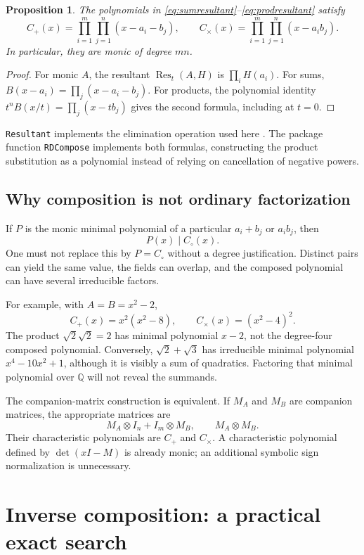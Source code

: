 \documentclass[11pt,letterpaper]{article}
\newtheorem{proposition}[theorem]{Proposition}
\theoremstyle{definition}
\newcommand{\Q}{\mathbb Q}
\newcommand{\Res}{\operatorname{Res}}
\newcommand{\code}[1]{\texttt{#1}}
\begin{document}
\begin{proposition}\label{prop:forward}
The polynomials in \eqref{eq:sumresultant}--\eqref{eq:prodresultant} satisfy
\[
 C_+(x)=\prod_{i=1}^{m}\prod_{j=1}^{n}(x-a_i-b_j),\qquad
 C_{\times}(x)=\prod_{i=1}^{m}\prod_{j=1}^{n}(x-a_ib_j).
\]
In particular, they are monic of degree $mn$.
\end{proposition}
\begin{proof}
For monic $A$, the resultant $\Res_t(A,H)$ is $\prod_i H(a_i)$. For sums,
$B(x-a_i)=\prod_j(x-a_i-b_j)$. For products, the polynomial identity
$t^nB(x/t)=\prod_j(x-tb_j)$ gives the second formula, including at $t=0$.
\end{proof}
\code{Resultant} implements the elimination operation used here \cite{resultant}. The package function \code{RDCompose} implements both formulas, constructing the product substitution as a polynomial instead of relying on cancellation of negative powers.

\subsection{Why composition is not ordinary factorization}
If $P$ is the monic minimal polynomial of a particular $a_i+b_j$ or $a_ib_j$, then
\begin{equation}\label{eq:divisibility}
 P(x)\mid C_{\circ}(x).
\end{equation}
One must not replace this by $P=C_{\circ}$ without a degree justification. Distinct pairs can yield the same value, the fields can overlap, and the composed polynomial can have several irreducible factors.

For example, with $A=B=x^2-2$,
\[
 C_+(x)=x^2(x^2-8),\qquad C_{\times}(x)=(x^2-4)^2.
\]
The product $\sqrt2\sqrt2=2$ has minimal polynomial $x-2$, not the degree-four composed polynomial. Conversely, $\sqrt2+\sqrt3$ has irreducible minimal polynomial $x^4-10x^2+1$, although it is visibly a sum of quadratics. Factoring that minimal polynomial over $\Q$ will not reveal the summands.

The companion-matrix construction is equivalent. If $M_A$ and $M_B$ are companion matrices, the appropriate matrices are
\[
 M_A\otimes I_n+I_m\otimes M_B,
 \qquad M_A\otimes M_B.
\]
Their characteristic polynomials are $C_+$ and $C_{\times}$. A characteristic polynomial defined by $\det(xI-M)$ is already monic; an additional symbolic sign normalization is unnecessary.

\section{Inverse composition: a practical exact search}
\end{document}

